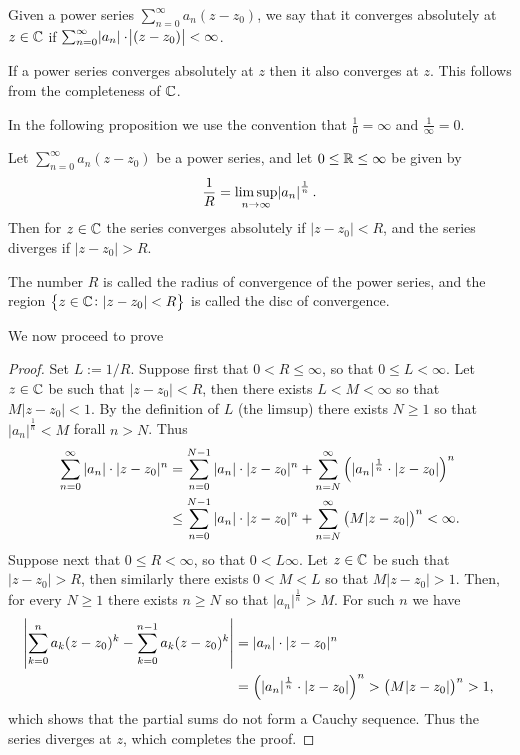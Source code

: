 \documentclass[11pt,a4paper]{article}
\newcommand{\powerseries}{\sum_{n=0}^{\infty} a_n (z - z_0)}
\begin{document}
\begin{definition}
  Given a power series $\sum_{n=0}^{\infty} a_n (z - z_0)$,
  we say that it converges absolutely at $z \in \mathbb{C}$ if
  $\sum_{n=0}^{\infty} \abs{a_n} \cdot \abs{(z - z_0)} < \infty$.
\end{definition}

\begin{proposition}
  If a power series converges absolutely at $z$ then it also converges at $z$.
  This follows from the completeness of $\mathbb{C}$.
\end{proposition}

In the following proposition we use the convention that $\frac{1}{0} = \infty$
and $\frac{1}{\infty} = 0$.

\begin{proposition}
  \label{thm:hadamard}
  Let $\powerseries$ be a power series, and let $0 \le \mathbb{R} \le \infty$
  be given by
  \[
    \frac{1}{R} = \limsup_{n \to \infty} \abs{a_n}^{\frac 1n}.
  \]
  Then for $z \in \mathbb{C}$ the series converges absolutely if $|z - z_0| < R$,
  and the series diverges if $|z - z_0| > R$.
\end{proposition}

\begin{remark}
  The number $R$ is called the radius of convergence of the power series,
  and the region $\set{z \in \mathbb{C}\colon |z - z_0| < R}$ is called the disc
  of convergence.
\end{remark}

We now proceed to prove 

\begin{proof}
  Set $L := 1/R$.
  Suppose first that $0 < R \le \infty$, so that $0 \le L < \infty$.
  Let $z \in \mathbb{C}$ be such that $|z - z_0| < R$, then there exists
  $L < M < \infty$ so that $M |z - z_0| < 1$.
  By the definition of $L$ (the limsup) there exists $N \geq 1$ so that
  $|a_n|^{\frac 1n} < M$ forall $n > N$. Thus
  \begin{align*}
    \sum_{n=0}^{\infty} |a_n| \cdot |z - z_0|^n &=
    \sum_{n=0}^{N-1} |a_n| \cdot |z - z_0|^n +
    \sum_{n=N}^{\infty} \del{|a_n|^{\frac 1n} \cdot |z - z_0|}^n \\ &\le
    \sum_{n=0}^{N-1} |a_n| \cdot |z - z_0|^n +
    \sum_{n=N}^{\infty} \del{M |z - z_0|}^n <
    \infty.
  \end{align*}
  Suppose next that $0 \le R < \infty$, so that $0 < L \infty$.
  Let $z \in \mathbb{C}$ be such that $|z - z_0| > R$, then similarly there
  exists $0 < M < L$ so that $M |z - z_0| > 1$.
  Then, for every $N \geq 1$ there exists $n \geq N$ so that 
  $|a_n|^{\frac 1n} > M$.
  For such $n$ we have
  \begin{align*}
    \abs{\sum_{k=0}^{n} a_k(z-z_0)^k - \sum_{k=0}^{n-1} a_k(z-z_0)^k} &=
    |a_n| \cdot |z - z_0|^n \\ &=
    \del{|a_n|^{\frac 1n} \cdot |z - z_0|}^n >
    \del{M |z - z_0|}^n > 1,
  \end{align*}
  which shows that the partial sums do not form a Cauchy sequence.
  Thus the series diverges at $z$, which completes the proof.
\end{proof}
\end{document}
